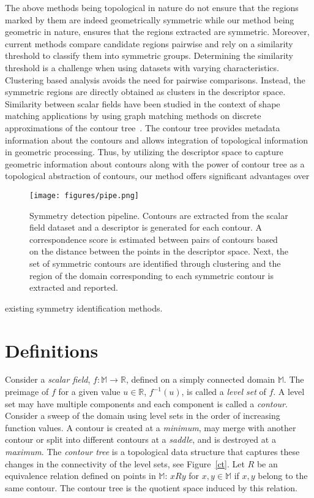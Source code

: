 \documentclass[review,journal]{vgtc}         %
\begin{document}
The above methods being topological in nature do not ensure that the regions marked by
them are indeed geometrically symmetric while our method being geometric in nature, 
ensures that the regions extracted are symmetric. Moreover, current methods compare candidate regions 
pairwise and rely on a similarity threshold to classify them into symmetric groups. Determining
the similarity threshold is a challenge when using datasets with varying characteristics.
Clustering based analysis avoids the need for pairwise comparisons. Instead, the symmetric regions
are directly obtained as clusters in the descriptor space. 
Similarity between scalar fields have been
studied in the context of shape matching applications by using graph matching methods on 
discrete approximations of the contour tree~\cite{ZhangBKDNB06,HilagaSKK01}.
The contour tree provides metadata information about the contours
and allows integration of topological information in geometric processing. Thus, by utilizing 
the descriptor space to capture geometric information about contours along with the power of contour 
tree as a topological abstraction of contours, our method offers significant advantages over 
\begin{figure*}[t]
	\centering
		\texttt{[image: figures/pipe.png]}
	\caption{\label{pipeline} Symmetry detection pipeline. Contours are extracted
		from the scalar field dataset and a descriptor is generated for each contour.
		A correspondence score is estimated between pairs of contours based on the
		distance between the points in the descriptor space. Next, the set of symmetric
		contours are identified through clustering and the region of the domain corresponding
	to each symmetric contour is extracted and reported.}
\end{figure*}
existing symmetry identification methods. 
\section{Definitions}
Consider a \emph{scalar field}, $f : \mathbb{M}  \rightarrow \mathbb{R}$, defined on a 
simply connected domain $\mathbb{M}$. The preimage of $f$ for a given value $u \in \mathbb{R}$, 
$f^{-1}(u)$, is called a \emph{level set} of $f$. A level set may have multiple components
and each component is called a \emph{contour}. Consider a sweep of the domain using level sets in the order
of increasing function values. A contour is created at a \emph{minimum}, may merge
with another contour or split into different contours at a \emph{saddle}, and is destroyed
at a \emph{maximum}. The \emph{contour tree} is a topological 
data structure that captures these changes in the connectivity of the level sets, see Figure~\ref{ct}.
Let $R$ be an equivalence relation defined on points in $\mathbb{M}$: $xRy$ for $x,y 
\in \mathbb{M}$  if $x,y$ belong to the same contour. The contour tree is the quotient space 
induced by this relation. 
\end{document}
